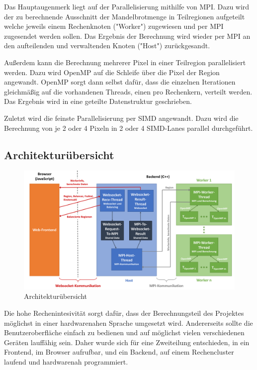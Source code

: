 Das Hauptaugenmerk liegt auf der Parallelisierung mithilfe von MPI.
Dazu wird der zu berechnende Ausschnitt der Mandelbrotmenge in Teilregionen aufgeteilt
welche jeweils einem Rechenknoten ("Worker") zugewiesen und per MPI zugesendet werden sollen.
Das Ergebnis der Berechnung wird wieder per MPI an den aufteilenden und verwaltenden Knoten ("Host")
zurückgesandt.

Außerdem kann die Berechnung mehrerer Pixel in einer Teilregion parallelisiert werden.
Dazu wird OpenMP auf die Schleife über die Pixel der Region angewandt.
OpenMP sorgt dann selbst dafür, dass die einzelnen Iterationen gleichmäßig auf die vorhandenen
Threads, einen pro Rechenkern, verteilt werden.
Das Ergebnis wird in eine geteilte Datenstruktur geschrieben.

Zuletzt wird die feinste Parallelisierung per SIMD angewandt.
Dazu wird die Berechnung von je 2 oder 4 Pixeln in 2 oder 4 SIMD-Lanes parallel durchgeführt.

\subsection{Architekturübersicht}\label{sec:architektur}
\begin{figure}
	\centering
	\includegraphics[width=\linewidth]{img/Implementierung/ArchitekturAusfuehrlich.pdf}
	\caption{Architekturübersicht}
	\label{fig:architekturuebersicht_detail}
\end{figure}

Die hohe Rechenintesivität sorgt dafür, dass der Berechnungsteil des Projektes möglichst in einer
hardwarenahen Sprache umgesetzt wird.
Andererseits sollte die Benutzeroberfläche einfach zu bedienen und auf möglichst vielen verschiedenen Geräten lauffähig sein.
Daher wurde sich für eine Zweiteilung entschieden, in ein Frontend, im Browser aufrufbar, und ein Backend, auf einem Rechencluster
laufend und hardwarenah programmiert.

